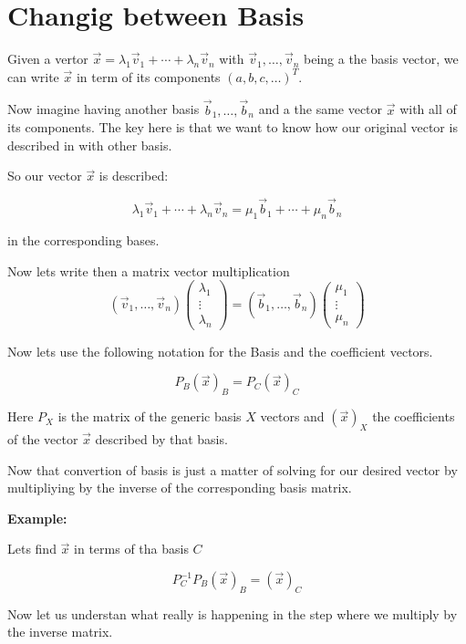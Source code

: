 \section{Changig between Basis}

Given a vertor \(\vec{x} = \lambda_1 \vec{v}_1 + \cdots + \lambda_n \vec{v}_n\) 
with \(\vec{v}_1, \dots, \vec{v}_n\)
being a the basis vector, we can write \(\vec{x}\) in term of its components \((a, b, c, \dots)^T\).

Now imagine having another basis \(\vec{b}_1, \dots, \vec{b}_n\) and a the same vector \(\vec{x}\)
with all of its components. The key here is that we want to know how our original
vector is described in with other basis.

So our vector \(\vec{x}\) is described:

\[\lambda_1 \vec{v}_1 + \cdots + \lambda_n \vec{v}_n = \mu_1 \vec{b}_1 + \cdots + \mu_n \vec{b}_n\]

in the corresponding bases.

Now lets write then a matrix vector multiplication
\[
(\vec{v}_1, \dots, \vec{v}_ n) 
\begin{pmatrix} \lambda_1 \\ \vdots \\ \lambda_n \end{pmatrix}
 =
(\vec{b}_1, \dots, \vec{b}_ n) 
\begin{pmatrix} \mu_1 \\ \vdots \\ \mu_n \end{pmatrix}
\]

Now lets use the following notation for the Basis and the coefficient vectors.

\[P_B (\vec{x})_B = P_C (\vec{x})_C\]

Here \(P_{X}\) is the matrix of the generic basis \(X\) vectors and \((\vec{x})_X\) the coefficients of the
vector \(\vec{x}\) described by that basis.

Now that convertion of basis is just a matter of solving for 
our desired vector by multipliying
by the inverse of the corresponding basis matrix.

\textbf{Example:}

Lets find \(\vec{x}\) in terms of tha basis \(C\)

\[P_{C}^{-1} P_B (\vec{x})_B = (\vec{x})_C\]

Now let us understan what really is happening in the step where we multiply by the inverse matrix.

